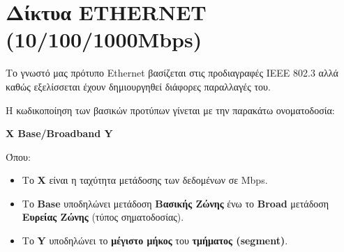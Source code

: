 %
%
\setcounter{section}{3}
\section{Δίκτυα ETHERNET (10/100/1000Mbps)}

Το γνωστό μας πρότυπο Ethernet βασίζεται στις προδιαγραφές IEEE 802.3 αλλά καθώς εξελίσσεται έχουν δημιουργηθεί διάφορες παραλλαγές του. 

Η κωδικοποίηση των βασικών προτύπων γίνεται με την παρακάτω ονοματοδοσία:

\begin{center}
\textbf{Χ Base/Broadband Y}
\end{center}

Όπου:

\begin{itemize}
\item Το \textbf{X} είναι η ταχύτητα μετάδοσης των δεδομένων σε Mbps.
\item Το \textbf{Base} υποδηλώνει μετάδοση \textbf{Βασικής Ζώνης} ένω το \textbf{Broad} μετάδοση \textbf{Ευρείας Ζώνης} (τύπος σηματοδοσίας).
\item Το \textbf{Y} υποδηλώνει το \textbf{μέγιστο μήκος} του \textbf{τμήματος (segment)}.
\end{itemize}

